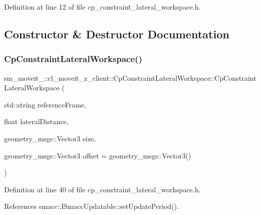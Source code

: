 Definition at line 12 of file cp\+\_\+constraint\+\_\+lateral\+\_\+workspace.\+h.



\subsection{Constructor \& Destructor Documentation}
\mbox{\label{classsm__moveit__4_1_1cl__moveit__z__client_1_1CpConstraintLateralWorkspace_a698854121e40c7c12ef8fce6f684cfea}} 
\subsubsection{\texorpdfstring{Cp\+Constraint\+Lateral\+Workspace()}{CpConstraintLateralWorkspace()}}
{\footnotesize\ttfamily sm\+\_\+moveit\+\_\+::cl\+\_\+moveit\+\_\+z\+\_\+client\+::\+Cp\+Constraint\+Lateral\+Workspace\+::\+Cp\+Constraint\+Lateral\+Workspace (\begin{DoxyParamCaption}\item[{std\+::string}]{reference\+Frame,  }\item[{float}]{lateral\+Distance,  }\item[{geometry\+\_\+msgs\+::\+Vector3}]{size,  }\item[{geometry\+\_\+msgs\+::\+Vector3}]{offset = {\ttfamily geometry\+\_\+msgs\+:\+:Vector3()} }\end{DoxyParamCaption})\hspace{0.3cm}{\ttfamily [inline]}}



Definition at line 40 of file cp\+\_\+constraint\+\_\+lateral\+\_\+workspace.\+h.



References smacc\+::\+I\+Smacc\+Updatable\+::set\+Update\+Period().


